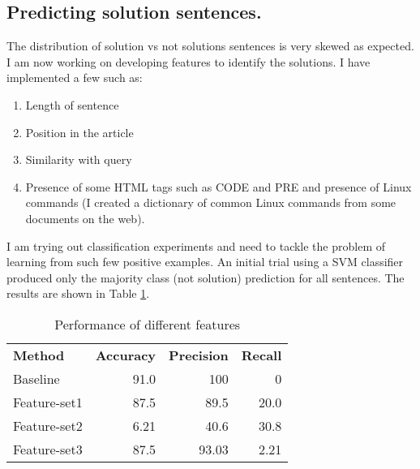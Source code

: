 \documentclass[11pt]{article}
\begin{document}
\subsection{Predicting solution sentences.}
The distribution of solution vs not solutions sentences is very skewed as expected. I am now
working on developing features to identify the solutions. I have implemented a few such as:


\begin{enumerate}   
\item Length of sentence
\item Position in the article
\item Similarity with query
\item Presence of some HTML tags such as CODE and PRE and presence 
of Linux commands (I created a dictionary of common Linux commands from some documents on the
web). 
\end{enumerate}


I am trying out classification experiments and need to tackle the problem of learning
from such few positive examples. An initial trial using a SVM classifier produced only the
majority class (not solution) prediction for all sentences. The results are shown in Table \ref{tab:results}. 

\begin{table}
\begin{tabular}{l r r r} 
{\bf Method} & {\bf Accuracy} & {\bf Precision} & {\bf Recall}\\  
Baseline     & 91.0           & 100             & 0\\
Feature-set1 & 87.5           & 89.5            & 20.0\\
Feature-set2 & 6.21           & 40.6            & 30.8\\
Feature-set3 & 87.5           & 93.03           & 2.21\\
\end{tabular}
\caption{Performance of different features}
\label{tab:results}
\end{table}
\end{document}
